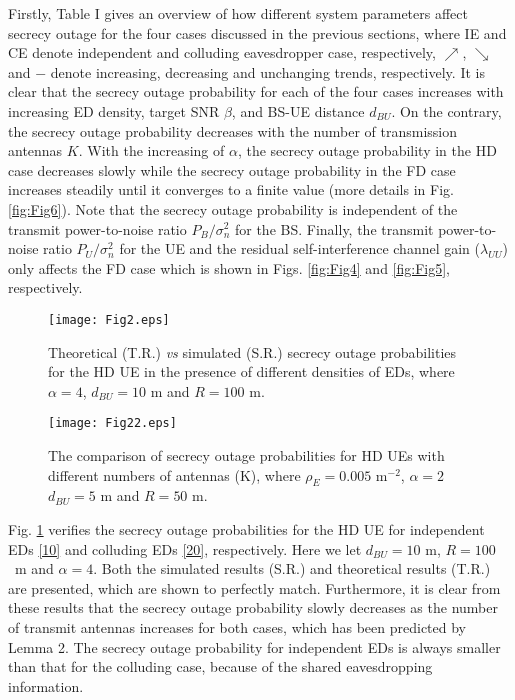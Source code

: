 \documentclass[10pt]{IEEEtran}
\begin{document}
Firstly, Table I gives an overview of how different system parameters affect secrecy outage for the four cases discussed in the previous sections, where IE and CE denote independent and colluding eavesdropper case, respectively, $\nearrow$, $\searrow$ and $-$ denote increasing, decreasing and unchanging trends, respectively. It is clear that the secrecy outage probability for each of the four cases increases with increasing ED density, target SNR $\beta$, and BS-UE distance $d_{BU}$. On the contrary, the secrecy outage probability decreases with the number of transmission antennas $K$. With the increasing of $\alpha$, the secrecy outage probability in the HD case decreases slowly while the secrecy outage probability in the FD case increases steadily until it converges to a finite value (more details in Fig. \ref{fig:Fig6}). Note that the secrecy outage probability is independent of the transmit power-to-noise ratio $P_B/\sigma^2_n$ for the BS. Finally, the transmit power-to-noise ratio $P_U/\sigma^2_n$ for the UE and the residual self-interference channel gain ($\lambda_{UU}$) only affects the FD case which is shown in Figs. \ref{fig:Fig4} and \ref{fig:Fig5}, respectively.

\begin{figure}[!t]
\centering
\texttt{[image: Fig2.eps]}
\caption{\small Theoretical (T.R.) {\em vs} simulated (S.R.) secrecy outage probabilities for the HD UE in the presence of different densities of EDs, where $\alpha = 4$, $d_{BU} = 10$ m and $R = 100$ m.}
\label{fig:Fig2}
\end{figure}


\begin{figure}[!t]
\centering
\texttt{[image: Fig22.eps]}
\caption{\small The comparison of secrecy outage probabilities for HD UEs with different numbers of antennas (K), where $\rho_E = 0.005$ $\textrm{m}^{-2}$, $\alpha=2$ $d_{BU} = 5$ m and $R = 50$ m.}
\label{fig:Fig22}
\end{figure}

Fig. \ref{fig:Fig2} verifies the secrecy outage probabilities for the HD UE for independent EDs \eqref{10} and colluding EDs \eqref{20}, respectively. Here we let $d_{BU} = 10$ m, $R = 100$~m and $\alpha = 4$. Both the simulated results (S.R.) and theoretical results (T.R.) are presented, which are shown to perfectly match. Furthermore, it is clear from these results that the secrecy outage probability slowly decreases as the number of transmit antennas increases for both cases, which has been predicted by Lemma 2. The secrecy outage probability for independent EDs is always smaller than that for the colluding case, because of the shared eavesdropping information.
\end{document}
